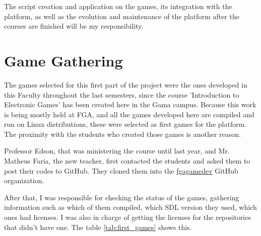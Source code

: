 The script creation and application on the games, its integration with the platform, as well as the evolution and maintenance of the platform after the courses are finished will be my responsibility.


\section[Game Gathering]{Game Gathering}

The games selected for this first part of the project were the ones developed in this Faculty throughout the last semesters, since the course 'Introduction to Electronic Games' has been created here in the Gama campus. Because this work is being mostly held at FGA, and all the games developed here are compiled and run on Linux distributions, these were selected as first games for the platform. The proximity with the students who created those games is another reason.

Professor Edson, that was ministering the course until last year, and Mr. Matheus Faria, the new teacher, first contacted the students and asked them to post their codes to GitHub. They cloned them into the \href{https://github.com/fgagamedev/}{fgagamedev} GitHub organization.

After that, I was responsible for checking the status of the games, gathering information such as which of them compiled, which SDL version they used, which ones had licenses. I was also in charge of getting the licenses for the repositories that didn't have one. The table \ref{tab:first_games} shows this.

